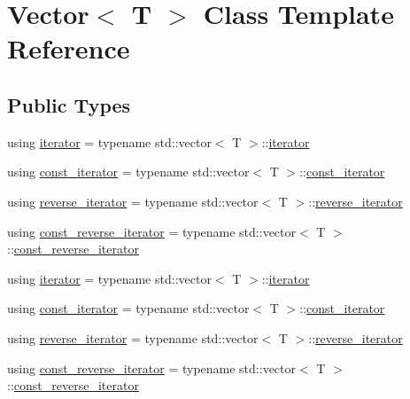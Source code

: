 \hypertarget{classVector}{}\section{Vector$<$ T $>$ Class Template Reference}
\label{classVector}
\subsection*{Public Types}
\begin{DoxyCompactItemize}
\item 
using \hyperlink{classVector_a45531016f99e90887e0f890f2da943e4}{iterator} = typename std\+::vector$<$ T $>$\+::\hyperlink{classVector_a45531016f99e90887e0f890f2da943e4}{iterator}
\item 
using \hyperlink{classVector_a484e934cc06bb84c7d70042e792b6e55}{const\+\_\+iterator} = typename std\+::vector$<$ T $>$\+::\hyperlink{classVector_a484e934cc06bb84c7d70042e792b6e55}{const\+\_\+iterator}
\item 
using \hyperlink{classVector_a6afe8339bd8b2187c173c0f46bbd7d63}{reverse\+\_\+iterator} = typename std\+::vector$<$ T $>$\+::\hyperlink{classVector_a6afe8339bd8b2187c173c0f46bbd7d63}{reverse\+\_\+iterator}
\item 
using \hyperlink{classVector_a963c193ac2399eed1cf20d74f559ef2a}{const\+\_\+reverse\+\_\+iterator} = typename std\+::vector$<$ T $>$\+::\hyperlink{classVector_a963c193ac2399eed1cf20d74f559ef2a}{const\+\_\+reverse\+\_\+iterator}
\item 
using \hyperlink{classVector_a45531016f99e90887e0f890f2da943e4}{iterator} = typename std\+::vector$<$ T $>$\+::\hyperlink{classVector_a45531016f99e90887e0f890f2da943e4}{iterator}
\item 
using \hyperlink{classVector_a484e934cc06bb84c7d70042e792b6e55}{const\+\_\+iterator} = typename std\+::vector$<$ T $>$\+::\hyperlink{classVector_a484e934cc06bb84c7d70042e792b6e55}{const\+\_\+iterator}
\item 
using \hyperlink{classVector_a6afe8339bd8b2187c173c0f46bbd7d63}{reverse\+\_\+iterator} = typename std\+::vector$<$ T $>$\+::\hyperlink{classVector_a6afe8339bd8b2187c173c0f46bbd7d63}{reverse\+\_\+iterator}
\item 
using \hyperlink{classVector_a963c193ac2399eed1cf20d74f559ef2a}{const\+\_\+reverse\+\_\+iterator} = typename std\+::vector$<$ T $>$\+::\hyperlink{classVector_a963c193ac2399eed1cf20d74f559ef2a}{const\+\_\+reverse\+\_\+iterator}
\end{DoxyCompactItemize}
